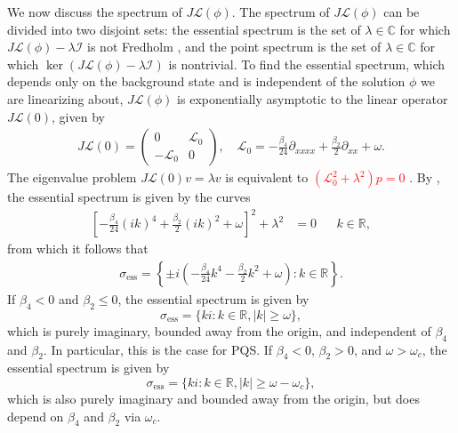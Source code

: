 \documentclass[12pt]{elsarticle}
\def\R{{\mathbb R}}
\def\C{{\mathbb C}}
\def\calL{{\mathcal L}}
\def\calI{{\mathcal I}}
\newcommand{\revised}[1]{ \textcolor{red}{#1} }
\begin{document}
We now discuss the spectrum of $J \calL(\phi)$. The spectrum of $J \calL(\phi)$ can be divided into two disjoint sets: the essential spectrum is the set of $\lambda \in \C$ for which $J \calL(\phi) - \lambda \calI$ is not Fredholm \cite[Section 3.1]{Kapitula2013}, and the point spectrum is the set of $\lambda \in \C$ for which $\ker( J \calL(\phi) - \lambda \calI)$ is nontrivial. To find the essential spectrum, which depends only on the background state and is independent of the solution $\phi$ we are linearizing about, $J \calL(\phi)$ is exponentially asymptotic to the linear operator $J \calL(0)$, given by
\begin{align}\label{defL0}
J \calL(0) = 
\begin{pmatrix}
0 & \calL_0 \\
-\calL_0 & 0
\end{pmatrix}, \quad
\calL_0 = -\frac{\beta_4}{24} \partial_{xxxx} + \frac{\beta_2}{2} \partial_{xx} + \omega.
\end{align}
The eigenvalue problem $J \calL(0) v = \lambda v$ is equivalent to \revised{$(\calL_0^2 + \lambda^2)p = 0$}. By \cite[Theorem 3.1.13]{Kapitula2013}, the essential spectrum is given by the curves
\begin{align*}
\left[ -\frac{\beta_4}{24} (ik)^4 + \frac{\beta_2}{2}(ik)^2 + \omega \right]^2 + \lambda^2 &= 0 && k \in \R,
\end{align*}
from which it follows that
\begin{align*}
\sigma_{\text{ess}} = \left\{ \pm i \left( -\frac{\beta_4}{24}k^4 - \frac{\beta_2}{2}k^2 + \omega \right) : k \in \R \right\}.
\end{align*}
If $\beta_4 < 0$ and $\beta_2 \leq 0$, the essential spectrum is given by 
\begin{equation}\label{PQSessspec}
\sigma_{\text{ess}} = \{ k i : k \in \R, |k| \geq \omega \},
\end{equation}
which is purely imaginary, bounded away from the origin, and independent of $\beta_4$ and $\beta_2$. In particular, this is the case for PQS. If $\beta_4 < 0$, $\beta_2 > 0$, and $\omega > \omega_c$, the essential spectrum is given by 
\begin{equation}\label{essspec2}
\sigma_{\text{ess}} = \{ k i : k \in \R, |k| \geq \omega - \omega_c \},
\end{equation}
which is also purely imaginary and bounded away from the origin, but does depend on $\beta_4$ and $\beta_2$ via $\omega_c$.
\end{document}
